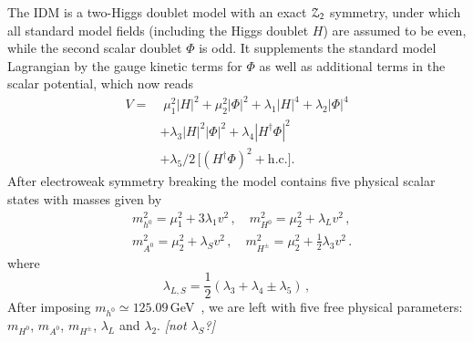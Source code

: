 \documentclass[preprint,number,sort&compress,twocolumn,3p]{elsstyarticle}
\newcommand{\hn}{h^0}
\newcommand{\Hn}{{H^0}}
\newcommand{\An}{A^0}
\newcommand{\Hp}{{H^\pm}}
\newcommand{\com}[1]{\emph{\color{red}[#1]}}  %
\begin{document}
The IDM is a two-Higgs doublet model with an exact ${\cal{Z}}_2$ symmetry, 
under which all standard model fields (including the Higgs doublet $H$) 
are assumed to be even, while the second scalar doublet $\Phi$ is odd. 
It supplements the standard model Lagrangian by the gauge kinetic terms for $\Phi$ as well as
additional terms in the scalar potential, which now reads
\begin{equation}
\begin{split}
	V = &\;\mu_1^2 |H|^2  + \mu_2^2|\Phi|^2 + \lambda_1 |H|^4+ \lambda_2 |\Phi|^4 \\
	&+ \lambda_3 |H|^2| \Phi|^2
		+ \lambda_4 |H^\dagger\Phi|^2 \\
		&+ \lambda_5/2\,\big[ (H^\dagger\Phi)^2 + \mathrm{h.c.} \big].
\label{Eq:TreePotential}
\end{split}
\end{equation}
After electroweak symmetry breaking the model contains five physical scalar states with masses given by
\begin{equation}
\begin{split}
	&m_{\hn}^2 = \mu_1^2 + 3 \lambda_1 v^2\,,\quad
	m_{\Hn}^2= \mu_2^2 + \lambda_L v^2\,, \\ 
	&m_{\An}^2 = \mu_2^2 + \lambda_S v^2\,,\quad
	m_{\Hp}^2 = \mu_2^2 + \frac{1}{2} \lambda_3 v^2\,.
\end{split}
\end{equation}
where
\begin{equation}
	\lambda_{L,S} = \frac{1}{2} \left( \lambda_3 + \lambda_4 \pm \lambda_5 \right)\,,
\end{equation}
After imposing $m_{\hn} \simeq 125.09$\,GeV~\cite{pdg}, we are left with five free physical parameters: $m_{\Hn}$, $m_{\An}$, $m_{\Hp}$, $\lambda_L$ and $\lambda_2$. \com{not $\lambda_S$?}
\end{document}
